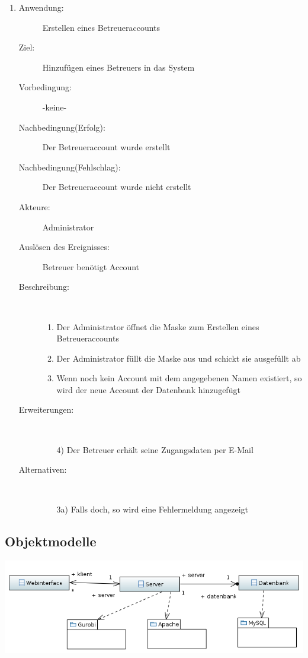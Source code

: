 \documentclass[parskip=full]{scrartcl}
\newcommand{\swtLabel}[1]{\textbf{\textbackslash #1\arabic*0\textbackslash}}
\begin{document}
\begin{enumerate} [label=\swtLabel{A}]
  
  \item
  \begin{description}
  \item[Anwendung:] Erstellen eines Betreueraccounts
  \item[Ziel:] Hinzufügen eines Betreuers in das System
  	\item[Vorbedingung:] -keine-
  	\item[Nachbedingung(Erfolg):] Der Betreueraccount wurde erstellt
  	\item[Nachbedingung(Fehlschlag):] Der Betreueraccount wurde nicht erstellt
  	\item[Akteure:] Administrator
  	\item[Auslösen des Ereignisses:] Betreuer benötigt Account
  	\item[Beschreibung:]~
  	 \begin{enumerate} 
  	   \item Der Administrator öffnet die Maske zum Erstellen eines
  	   Betreueraccounts  
  	   \item Der Administrator füllt die Maske aus und schickt sie ausgefüllt ab
  	   \item Wenn noch kein Account mit dem angegebenen Namen existiert, so wird
  	   der neue Account der Datenbank hinzugefügt
  	 \end{enumerate} 
  	\item[Erweiterungen:]~
  	 \begin{enumerate}
  	   \item[4)] Der Betreuer erhält seine Zugangsdaten per E-Mail
  	 \end{enumerate}  
  	\item[Alternativen:] ~
  	 \begin{enumerate}
  	  \item[3a)] Falls doch, so wird eine Fehlermeldung angezeigt
  	 \end{enumerate}  
  \end{description}
  
\end{enumerate}  
\subsection{Objektmodelle}

\includegraphics[width=\linewidth]{diagramme_pflichtenheft/ClassDiagram.PNG}
\end{document}
